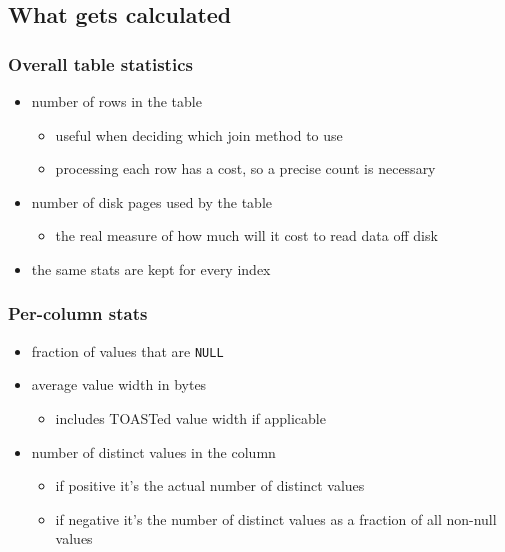 \documentclass{beamer}
\begin{document}
\subsection{What gets calculated}

\begin{frame}
  \frametitle{Overall table statistics}

  \begin{itemize}
  \item number of \alert{rows} in the table
    \begin{itemize}
    \item useful when deciding which join method to use
    \item processing each row has a cost, so a precise count is necessary
    \end{itemize}
  \item number of \alert{disk pages} used by the table
    \begin{itemize}
    \item the real measure of how much will it cost to \alert{read data off disk}
    \end{itemize}
  \item the same stats are kept for every \alert{index}
  \end{itemize}
\end{frame}

\begin{frame}
  \frametitle{Per-column stats}

  \begin{itemize}
  \item fraction of values that are \alert{\texttt{NULL}}
  \item average value \alert{width in bytes}
    \begin{itemize}
    \item includes TOASTed value width if applicable
    \end{itemize}
  \item number of \alert{distinct values} in the column
    \begin{itemize}
    \item if \alert{positive} it's the actual number of distinct values
    \item if \alert{negative} it's the number of distinct values as a fraction of all
      non-null values
    \end{itemize}
  \end{itemize}
\end{frame}
\end{document}
